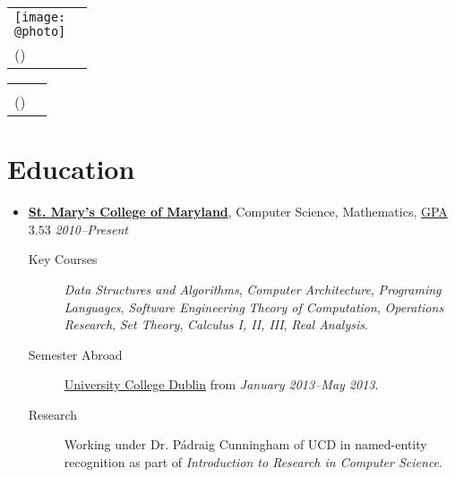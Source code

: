 \documentclass[11pt,letterpaper]{article}
\author{Sean Edward Allred}
\makeatletter
\newcommand{\position}[5]{\item%
  \begin{tabular*}{1.0\linewidth}{l@{\extracolsep{\fill}}r}
    #1 & #2\\
    \textit{#3} & \textit{#4---#5}
  \end{tabular*}}
\renewcommand{\position}[6][\textbullet]{%
\item[#1] \hspace*{-2em}\textbf{#2}, #4, #3\hfill
  \textit{#5--#6}\vspace*{-.8em}}
\renewcommand{\maketitle}{%
  \noindent
  \ifdefined\@photo
  \usepackage{multirow}
  \begin{tabular*}{1.0\linewidth}{l@{\extracolsep{\fill}}r}
    \multirow{2}{*}{\texttt{[image: \\@photo]}}\\
     {\@namestyle\@author}           & \@addressA\\
    {\@emailstyle\@email} (\@phone)  & \@addressB
  \end{tabular*}
  \else
  \begin{tabular*}{1.0\linewidth}{l@{\extracolsep{\fill}}r}
     {\@namestyle\@author}           & \@addressA\\
    {\@emailstyle\@email} (\@phone)  & \@addressB
  \end{tabular*}
  \fi
}
\newcommand{\course}[1]{\textit{#1}}
\makeatother
\begin{document}
\maketitle

\section*{Education}
\begin{itemize}
\position[] {\href{http://www.smcm.edu}
                {St. Mary's College of Maryland}}
          {\href{http://dl.dropbox.com/u/17471132/transcript20130330.pdf}
                {GPA $3.53$}}
          {Computer Science, Mathematics}
          {2010}{Present}
          \begin{description}
          \item[Key Courses] \course{Data Structures and Algorithms},
            \course{Computer Architecture}, \course{Programing
              Languages}, \course{Software Engineering} \course{Theory
              of Computation}, \course{Operations Research},
            \course{Set Theory}, \course{Calculus I, II, III},
            \course{Real Analysis}.
          \item[Semester Abroad] \href{http://www.ucd.ie}{University
              College Dublin} from \textit{January 2013--May 2013}.
          \item[Research] Working under Dr. P\'adraig Cunningham of
            UCD in named-entity recognition as part of
            \textit{Introduction to Research in Computer Science}.
          \end{description}
\end{itemize}
\end{document}
